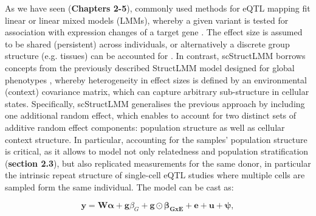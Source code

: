 As we have seen (\textbf{Chapters 
2-5}), commonly used methods for eQTL mapping fit linear or linear mixed models (LMMs),  whereby a given variant is tested for association with expression changes of a target gene \cite{kilpinen2017common}. 
The effect size is assumed to be shared (persistent) across individuals, or alternatively a discrete group structure (e.g. tissues) can be accounted for \cite{fusi2012joint}. 
In contrast, scStructLMM borrows concepts from the previously described StructLMM model designed for global phenotypes \cite{moore2019linear}, whereby heterogeneity in effect sizes is defined by an environmental (context) covariance matrix, which can capture arbitrary sub-structure in cellular states. 
Specifically, scStructLMM generalises the previous approach by including one additional random effect, which enables to  account for two distinct sets of additive random effect components: population structure as well as cellular context structure.
In particular, accounting for the samples' population structure is critical, as it allows to model not only relatedness and population stratification (\textbf{section 
2.3}), but also replicated measurements for the same donor, in particular the intrinsic repeat structure of single-cell eQTL studies where multiple cells are sampled form the same individual. 
The model can be cast as:

\begin{equation}\label{eq:scStructLMM}
 \mathbf{y} =  \mathbf{W}\boldsymbol{\alpha} + \mathbf{g}\beta_G + \mathbf{g} \odot \boldsymbol{\beta_{GxE}} + \mathbf{e} + \mathbf{u} + \boldsymbol{\psi}, 
\end{equation}


